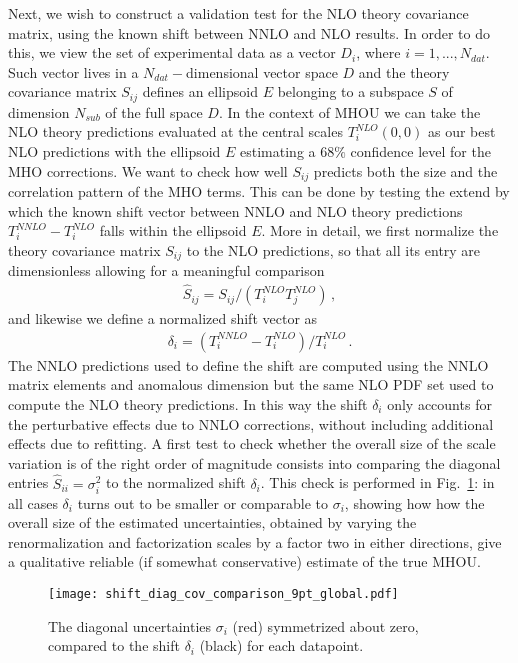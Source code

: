     Next, we wish to construct a validation test for the NLO theory covariance matrix, using the known shift between
    NNLO and NLO results.
    In order to do this, we view the set of experimental data as a vector $D_i$, where $i = 1, ..., N_{dat}$.
    Such vector lives in a $N_{dat}-$dimensional vector space $D$ and
    the theory covariance matrix $S_{ij}$ defines an ellipsoid $E$ belonging to a subspace $S$ of dimension
    $N_{sub}$ of the full space $D$. 
    In the context of MHOU we can take the NLO theory predictions evaluated at the central scales $T_i^{NLO}\left(0,0\right)$
    as our best NLO predictions with the ellipsoid $E$ estimating a $68\%$ confidence level for the MHO corrections. 
    We want to check how well $S_{ij}$ predicts both the size and the correlation pattern
    of the MHO terms. This can be done by testing the extend by which the known shift vector between NNLO and NLO theory predictions
    $T_i^{NNLO} - T_i^{NLO}$
    falls within the ellipsoid $E$.
    More in detail, we first normalize the theory covariance matrix $S_{ij}$ to the NLO predictions, so that all its
    entry are dimensionless allowing for a meaningful comparison 
    \begin{align}
        \hat{S}_{ij} = S_{ij}/\left(T_i^{NLO}T_j^{NLO}\right)\,,
    \end{align}
    and likewise we define a normalized shift vector as
    \begin{align}
        \delta_i = \left(T_i^{NNLO}-T_i^{NLO}\right)/T_i^{NLO}\,.
    \end{align}
    The NNLO predictions used to define the shift are computed using the NNLO matrix elements and anomalous dimension
    but the same NLO PDF set used to compute the NLO theory predictions. In this way the shift $\delta_i$ 
    only accounts for the perturbative effects due to NNLO corrections, without including additional effects
    due to refitting.
    A first test to check whether the overall size of the scale variation is of the right order of magnitude
    consists into comparing the diagonal entries $\hat{S}_{ii} = \sigma_i^2$ to the normalized shift $\delta_i$.
    This check is performed in Fig.~\ref{fig:diag_shift_validation_symmetric}: in all cases 
    $\delta_i$ turns out to be smaller or comparable to $\sigma_i$, showing how how
    the overall size of the estimated uncertainties, obtained by varying the renormalization and factorization scales by
    a factor two in either directions, give a qualitative reliable (if somewhat conservative) estimate of the true MHOU. 
    \begin{figure}[t!]
        \begin{center}
          \texttt{[image: shift\_diag\_cov\_comparison\_9pt\_global.pdf]}
          \caption{\small The diagonal uncertainties  $\sigma_i$ (red)
            symmetrized about zero,
            compared to the shift $\delta_i$ (black) for each
            datapoint.}
          \label{fig:diag_shift_validation_symmetric}
        \end{center}
    \end{figure}

